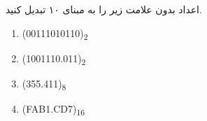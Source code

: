 اعداد بدون علامت زیر را به مبنای ۱۰ تبدیل کنید.

\begin{latin}
	\begin{enumerate}
		\item 
		(00111010110)\textsubscript{2}

		\item 
		(1001110.011)\textsubscript{2}
		
		\item 
		(355.411)\textsubscript{8}
		
		\item 
		(FAB1.CD7)\textsubscript{16}
	\end{enumerate}
\end{latin}